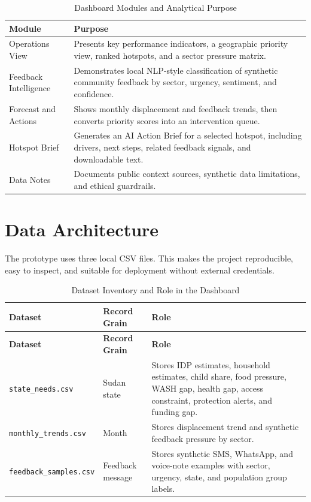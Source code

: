 \documentclass[11pt,a4paper]{article}
\begin{document}
\begin{table}[H]
\centering
\caption{Dashboard Modules and Analytical Purpose}
\begin{tabularx}{\textwidth}{p{}Y}
\toprule
\textbf{Module} & \textbf{Purpose} \\
\midrule
Operations View & Presents key performance indicators, a geographic priority view, ranked hotspots, and a sector pressure matrix. \\
Feedback Intelligence & Demonstrates local NLP-style classification of synthetic community feedback by sector, urgency, sentiment, and confidence. \\
Forecast and Actions & Shows monthly displacement and feedback trends, then converts priority scores into an intervention queue. \\
Hotspot Brief & Generates an AI Action Brief for a selected hotspot, including drivers, next steps, related feedback signals, and downloadable text. \\
Data Notes & Documents public context sources, synthetic data limitations, and ethical guardrails. \\
\bottomrule
\end{tabularx}
\end{table}

\section{Data Architecture}

The prototype uses three local CSV files. This makes the project reproducible, easy to inspect, and suitable for deployment without external credentials.

\begin{longtable}{p{}p{}p{}}
\caption{Dataset Inventory and Role in the Dashboard} \\
\toprule
\textbf{Dataset} & \textbf{Record Grain} & \textbf{Role} \\
\midrule
\endfirsthead
\toprule
\textbf{Dataset} & \textbf{Record Grain} & \textbf{Role} \\
\midrule
\endhead
\texttt{state\_needs.csv} & Sudan state & Stores IDP estimates, household estimates, child share, food pressure, WASH gap, health gap, access constraint, protection alerts, and funding gap. \\
\texttt{monthly\_trends.csv} & Month & Stores displacement trend and synthetic feedback pressure by sector. \\
\texttt{feedback\_samples.csv} & Feedback message & Stores synthetic SMS, WhatsApp, and voice-note examples with sector, urgency, state, and population group labels. \\
\bottomrule
\end{longtable}
\end{document}

